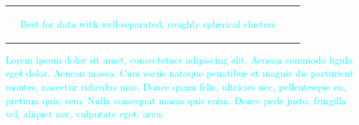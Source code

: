 \documentclass[%
 reprint,
 amsmath,amssymb,
 aps,
]{revtex4-2}
\begin{document}
\begin{table}
\begin{tabular}{| l | l | l | l |}
{\begin{flushleft}
        \end{flushleft}}
        \hspace{0.1cm}
        & 
        \hspace{0.1cm}
        \parbox{5.5cm}{\begin{flushleft}
        \textcolor{cyan}{Best for data with well-separated, roughly spherical clusters}  %
        \end{flushleft}}
        \hspace{0.1cm}
        \\
    \hline
    \end{tabular}
\end{table}

\textcolor{cyan}{Lorem ipsum dolor sit amet, consectetuer adipiscing elit. Aenean commodo ligula eget dolor. Aenean massa. Cum sociis natoque penatibus et magnis dis parturient montes, nascetur ridiculus mus. Donec quam felis, ultricies nec, pellentesque eu, pretium quis, sem. Nulla consequat massa quis enim. Donec pede justo, fringilla vel, aliquet nec, vulputate eget, arcu. }
\end{document}
